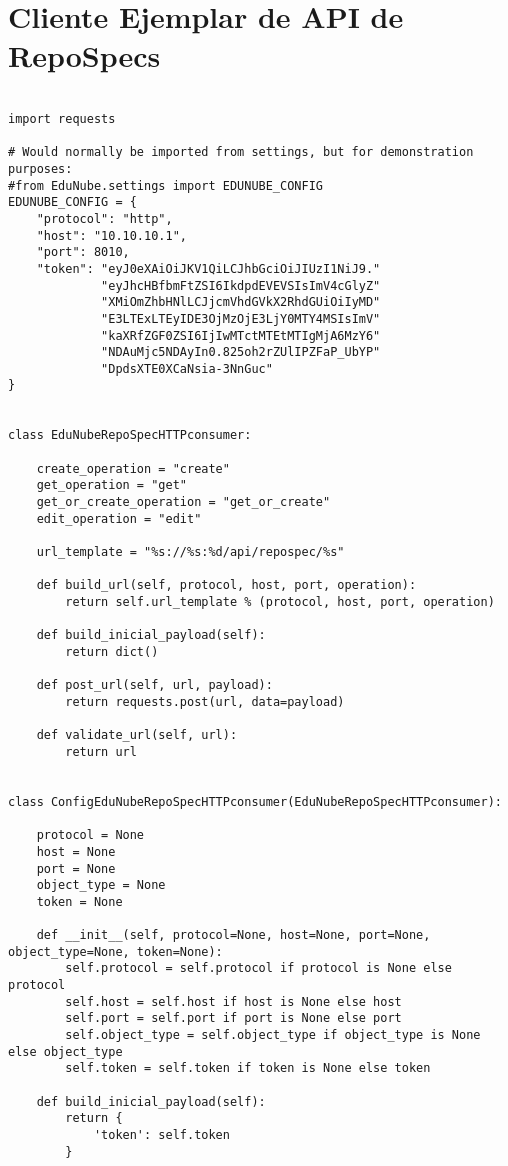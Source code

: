 \section{Cliente Ejemplar de API de RepoSpecs}
\lstset{language=Python}
\begin{lstlisting}[breaklines]

import requests

# Would normally be imported from settings, but for demonstration purposes:
#from EduNube.settings import EDUNUBE_CONFIG
EDUNUBE_CONFIG = {
    "protocol": "http",
    "host": "10.10.10.1",
    "port": 8010,
    "token": "eyJ0eXAiOiJKV1QiLCJhbGciOiJIUzI1NiJ9."
             "eyJhcHBfbmFtZSI6IkdpdEVEVSIsImV4cGlyZ"
             "XMiOmZhbHNlLCJjcmVhdGVkX2RhdGUiOiIyMD"
             "E3LTExLTEyIDE3OjMzOjE3LjY0MTY4MSIsImV"
             "kaXRfZGF0ZSI6IjIwMTctMTEtMTIgMjA6MzY6"
             "NDAuMjc5NDAyIn0.825oh2rZUlIPZFaP_UbYP"
             "DpdsXTE0XCaNsia-3NnGuc"
}


class EduNubeRepoSpecHTTPconsumer:

    create_operation = "create"
    get_operation = "get"
    get_or_create_operation = "get_or_create"
    edit_operation = "edit"

    url_template = "%s://%s:%d/api/repospec/%s"

    def build_url(self, protocol, host, port, operation):
        return self.url_template % (protocol, host, port, operation)

    def build_inicial_payload(self):
        return dict()

    def post_url(self, url, payload):
        return requests.post(url, data=payload)

    def validate_url(self, url):
        return url


class ConfigEduNubeRepoSpecHTTPconsumer(EduNubeRepoSpecHTTPconsumer):

    protocol = None
    host = None
    port = None
    object_type = None
    token = None

    def __init__(self, protocol=None, host=None, port=None, object_type=None, token=None):
        self.protocol = self.protocol if protocol is None else protocol
        self.host = self.host if host is None else host
        self.port = self.port if port is None else port
        self.object_type = self.object_type if object_type is None else object_type
        self.token = self.token if token is None else token

    def build_inicial_payload(self):
        return {
            'token': self.token
        }


\end{lstlisting}
